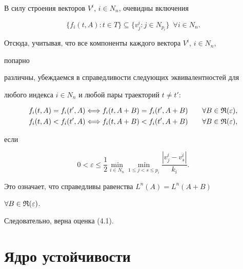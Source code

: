  


\begin{pf} 


В силу строения векторов $V^i$, $i\in N_n$, очевидны включения 


$$ 


\{f_i(t,A):t\in T\}\subseteq\{v^i_j:j\in N_{p_i}\}\ \;\forall 


i\in N_n. 


$$ 


Отсюда, учитывая, что все компоненты каждого вектора $V^i$, $i\in N_n$, 


попарно 


различны, убеждаемся в справедливости следующих эквивалентностей для 


любого индекса $i\in N_n$ и любой пары траекторий $t\ne t'$: 


\begin{alignat*}{2} 


f_i(t,A)=f_i(t',A)&\Longleftrightarrow f_i(t,A+B)= 


f_i(t',A+B) &\quad &\forall B\in\frak R(\varepsilon), \\ 


% 


f_i(t,A)<f_i(t',A)&\Longleftrightarrow f_i(t,A+B)< 


f_i(t',A+B) &\quad &\forall B\in\frak R(\varepsilon),


\end{alignat*} 


если 


$$ 


0<\varepsilon\le\frac{1}{2}\min_{i\in N_n} 


\min_{1\le j<s\le p_i}\frac{|v^i_j-v^i_s|}{k_i}. 


$$ 


Это означает, что справедливы равенства $L^n(A)=L^n(A+B)$ 


$\forall B\in\frak R(\varepsilon)$. 


Следовательно, верна оценка (4.1). 


\end{pf} 


 


\section{Ядро устойчивости} 


 


